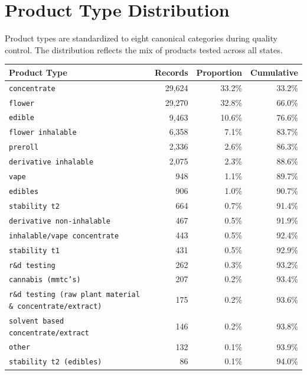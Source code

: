 \documentclass[11pt,letterpaper]{article}
\begin{document}
\section{Product Type Distribution}

Product types are standardized to eight canonical categories during
quality control. The distribution reflects the mix of products tested
across all states.

\vspace{1em}

{\small
\renewcommand{\arraystretch}{1.3}
\begin{tabularx}{\textwidth}{@{}Xrrr@{}}
\toprule
\textbf{Product Type} & \textbf{Records} & \textbf{Proportion} & \textbf{Cumulative} \\
\midrule
\texttt{concentrate} & 29,624 & 33.2\% & 33.2\% \\
\texttt{flower} & 29,270 & 32.8\% & 66.0\% \\
\texttt{edible} & 9,463 & 10.6\% & 76.6\% \\
\texttt{flower inhalable} & 6,358 & 7.1\% & 83.7\% \\
\texttt{preroll} & 2,336 & 2.6\% & 86.3\% \\
\texttt{derivative inhalable} & 2,075 & 2.3\% & 88.6\% \\
\texttt{vape} & 948 & 1.1\% & 89.7\% \\
\texttt{edibles} & 906 & 1.0\% & 90.7\% \\
\texttt{stability t2} & 664 & 0.7\% & 91.4\% \\
\texttt{derivative non-inhalable} & 467 & 0.5\% & 91.9\% \\
\texttt{inhalable/vape concentrate} & 443 & 0.5\% & 92.4\% \\
\texttt{stability t1} & 431 & 0.5\% & 92.9\% \\
\texttt{r\&d testing} & 262 & 0.3\% & 93.2\% \\
\texttt{cannabis (mmtc's)} & 207 & 0.2\% & 93.4\% \\
\texttt{r\&d testing (raw plant material \& concentrate/extract)} & 175 & 0.2\% & 93.6\% \\
\texttt{solvent based concentrate/extract} & 146 & 0.2\% & 93.8\% \\
\texttt{other} & 132 & 0.1\% & 93.9\% \\
\texttt{stability t2 (edibles)} & 86 & 0.1\% & 94.0\% \\

\end{tabularx}}
\end{document}
